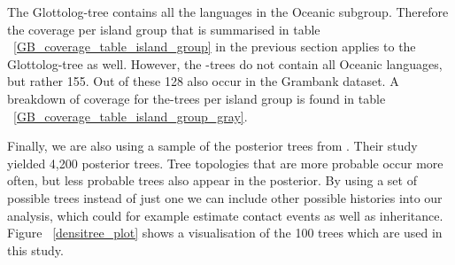 \documentclass[a4paper,10pt]{article} %
\begin{document}
The Glottolog-tree contains all the languages in the Oceanic subgroup. Therefore the coverage per island group that is summarised in table ~\ref{GB_coverage_table_island_group} in the previous section applies to the Glottolog-tree as well. However, the \cite{grayetal_2009}-trees do not contain all Oceanic languages, but rather 155. Out of these 128 also occur in the Grambank dataset. A breakdown of coverage for the\cite{grayetal_2009}-trees per island group is found in table ~\ref{GB_coverage_table_island_group_gray}.
%

\newpage

\newpage
Finally, we are also using a sample of the posterior trees from \cite{grayetal_2009}. Their study yielded 4,200 posterior trees. Tree topologies that are more probable occur more often, but less probable trees also appear in the posterior. By using a set of possible trees instead of just one we can include other possible histories into our analysis, which could for example estimate contact events as well as inheritance. Figure ~\ref{densitree_plot} shows a visualisation of the 100 trees which are used in this study.
\end{document}
